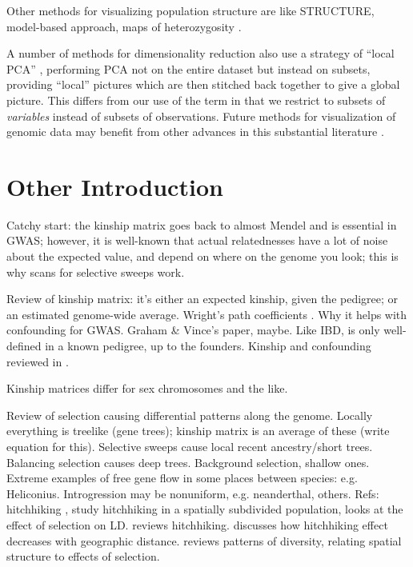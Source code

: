 \documentclass[11pt, oneside]{article}   	%
\begin{document}
Other methods for visualizing population structure are like STRUCTURE,
\citep{pritchard2000inference,falush2003inference,
falush2007inference,hubisz2009inferring} 
model-based approach,
\citep{yang2012modelbased} 
maps of heterozygosity
\citep{ramachandran2005support}. 

A number of methods for dimensionality reduction also use a strategy of ``local PCA''
\citep[e.g.][]{manjon2013diffusion,kambhatla1997dimension,weingessel2000local,roweis2000nonlinear},
performing PCA not on the entire dataset but instead on subsets,
providing ``local'' pictures which are then stitched back together to give a global picture.
This differs from our use of the term in that we restrict to subsets of \emph{variables} instead of subsets of observations.
Future methods for visualization of genomic data
may benefit from other advances in this substantial literature \citep[reviewed in][]{vandermaaten2009dimensionality}.


\section{Other Introduction}

Catchy start: the kinship matrix goes back to almost Mendel and is essential in GWAS;
however, it is well-known that actual relatednesses have a lot of noise about the expected value,
and depend on where on the genome you look;
this is why scans for selective sweeps work.

Review of kinship matrix: 
it's either an expected kinship, given the pedigree;
or an estimated genome-wide average.
Wright's path coefficients \citep{wright1943isolation}.
Why it helps with confounding for GWAS.
Graham \& Vince's paper, maybe.
Like IBD, is only well-defined in a known pedigree, up to the founders.
Kinship and confounding reviewed in \citet{astle2009population}.

Kinship matrices differ for sex chromosomes and the like.

Review of selection causing differential patterns along the genome.
Locally everything is treelike (gene trees);
kinship matrix is an average of these (write equation for this).
Selective sweeps cause local recent ancestry/short trees.
Balancing selection causes deep trees.
Background selection, shallow ones.
Extreme examples of free gene flow in some places between species: e.g. Heliconius.
Introgression may be nonuniform, e.g. neanderthal, others.
Refs: hitchhiking \citep{maynardsmith1974hitchhiking},
\citet{kim2011hitchhiking} study hitchhiking in a spatially subdivided population,
\citet{mcvean2007structure} looks at the effect of selection on LD.
\citet{barton2000genetic} reviews hitchhiking.
\citet{bierne2010distinctive} discusses how hitchhiking effect decreases with geographic distance.
\citet{charlesworth2003review} reviews patterns of diversity, relating spatial structure to effects of selection.
\end{document}
